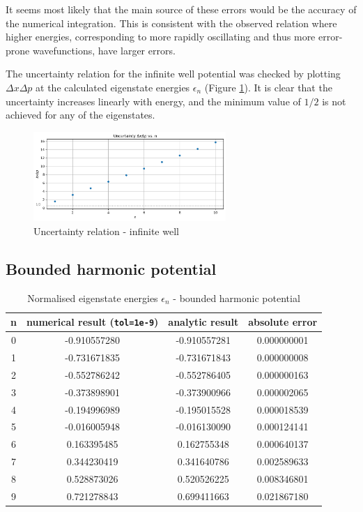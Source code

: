 \documentclass[11pt]{article}
\begin{document}
\vspace{.2cm}
It seems most likely that the main source of these errors would be the accuracy of
the numerical integration. This is consistent with the observed relation where 
higher energies, corresponding to more rapidly oscillating and thus more error-prone
wavefunctions, have larger errors.

The uncertainty relation for the infinite well potential was checked by plotting 
$\Delta x \Delta p$ at the calculated eigenstate energies $\epsilon_n$
(Figure \ref{fig:2}).
It is clear that the uncertainty increases linearly
with energy, and the minimum value of $1/2$ is not achieved for any
of the eigenstates.

\vspace{-.2cm}

\begin{figure}[!h]
  \centering
  \includegraphics*[width=0.65\textwidth]{uncertainty1.png}
  \vspace{-.2cm}
  \caption{Uncertainty relation - infinite well}
  \label{fig:2}
\end{figure}

\subsection{Bounded harmonic potential}

\begin{table}[htbp]
  \centering
  \caption{Normalised eigenstate energies $\epsilon_n$ - bounded harmonic potential}
  \vspace{-.3cm}
  \begin{tabular}{c|c|c|c}
    n & numerical result (\texttt{tol=1e-9}) & analytic result & absolute error\\
    \hline
    0 &-0.910557280&-0.910557281 & 0.000000001\\
    1 &-0.731671835&-0.731671843 & 0.000000008\\
    2 &-0.552786242&-0.552786405 & 0.000000163\\
    3 &-0.373898901&-0.373900966 & 0.000002065\\
    4 &-0.194996989&-0.195015528 & 0.000018539\\
    5 &-0.016005948&-0.016130090 & 0.000124141\\
    6 & 0.163395485& 0.162755348 & 0.000640137\\
    7 & 0.344230419& 0.341640786 & 0.002589633\\
    8 & 0.528873026& 0.520526225 & 0.008346801\\
    9 & 0.721278843& 0.699411663 & 0.021867180
  \end{tabular}
  \label{tab:2}
\end{table}
\end{document}

